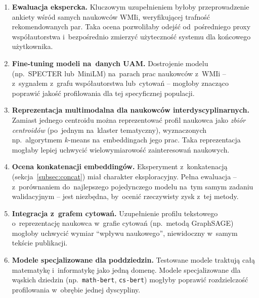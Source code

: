 \begin{enumerate}
    \item \textbf{Ewaluacja ekspercka.}
    Kluczowym uzupełnieniem byłoby przeprowadzenie ankiety
    wśród samych naukowców WMIi, weryfikującej trafność
    rekomendowanych par. Taka ocena pozwoliłaby odejść
    od~pośredniego proxy współautorstwa i~bezpośrednio zmierzyć
    użyteczność systemu dla końcowego użytkownika.

    \item \textbf{Fine-tuning modeli na~danych UAM.}
    Dostrojenie modelu (np.\ SPECTER lub~MiniLM)
    na~parach prac naukowców z~WMIi -- z~sygnałem z~grafu
    współautorstwa lub~cytowań -- mogłoby znacząco poprawić
    jakość profilowania dla tej specyficznej populacji.

    \item \textbf{Reprezentacja multimodalna dla naukowców interdyscyplinarnych.}
    Zamiast jednego centroidu można reprezentować profil
    naukowca jako \emph{zbiór centroidów} (po~jednym na~klaster tematyczny),
    wyznaczonych np.\ algorytmem $k$-means na~embeddingach jego prac.
    Taka reprezentacja mogłaby lepiej uchwycić wielowymiarowość
    zainteresowań naukowych.

    \item \textbf{Ocena konkatenacji embeddingów.}
    Eksperyment z~konkatenacją (sekcja~\ref{subsec:concat})
    miał charakter eksploracyjny.
    Pełna ewaluacja -- z~porównaniem do~najlepszego
    pojedynczego modelu na~tym samym zadaniu walidacyjnym --
    jest niezbędna, by~ocenić rzeczywisty zysk z~tej metody.

    \item \textbf{Integracja z~grafem cytowań.}
    Uzupełnienie profilu tekstowego o~reprezentację
    naukowca w~grafie cytowań (np.\ metodą GraphSAGE)
    mogłoby uchwycić wymiar ``wpływu naukowego'',
    niewidoczny w~samym tekście publikacji.

    \item \textbf{Modele specjalizowane dla poddziedzin.}
    Testowane modele traktują całą matematykę i~informatykę
    jako jedną domenę. Modele specjalizowane dla wąskich
    dziedzin (np.\ \texttt{math-bert}, \texttt{cs-bert})
    mogłyby poprawić rozdzielczość profilowania
    w~obrębie jednej dyscypliny.
\end{enumerate}



